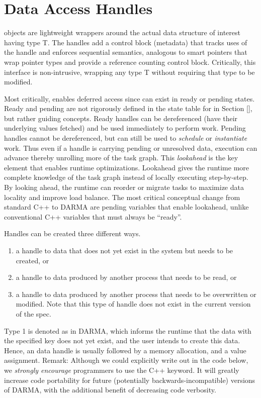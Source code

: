 

\section{Data Access Handles}
\label{sec:handles}
 objects are lightweight wrappers around the actual data structure of interest having type T. 
The handles add a control block (metadata) that tracks uses of the handle and enforces
\gls{sequential semantics}, analogous to smart pointers that wrap pointer types and provide a reference counting control block.
Critically, this interface is non-intrusive, wrapping any type T without requiring that type to be modified.

Most critically,  enables deferred access since \ahandle can exist in ready or pending states. 
Ready and pending are not rigorously defined in the state table for \ahandle in Section \ref{}, but rather guiding concepts.
Ready handles can be dereferenced (have their underlying values fetched) and be used immediately to perform work.
Pending handles cannot be dereferenced, but can still be used to \emph{schedule} or \emph{instantiate} work.
Thus even if a handle is carrying pending or unresolved data, execution can advance thereby unrolling more of the task graph.
This \emph{lookahead} is the key element that enables runtime optimizations.
Lookahead gives the runtime more complete knowledge of the task graph instead of locally executing step-by-step.
By looking ahead, the runtime can reorder or migrate tasks to maximize data locality and improve load balance.
The most critical conceptual change from standard C++ to DARMA are pending variables that enable lookahead, unlike conventional C++ variables that must always be ``ready''.

Handles can be created three different ways.
\begin{enumerate}
\item a handle to data that does not yet exist in the system
but needs to be created, or
\item a handle to data produced by another process that needs to
be read, or 
\item a handle to data produced by another process that needs to be overwritten or modified. 
Note that this type of handle does not exist in the current version of the spec.
\end{enumerate}

Type 1 is denoted as  in DARMA, 
which informs the runtime that the data with the 
specified key does not yet exist, and the user intends to 
create this data.%
Hence, an  data handle is usually 
followed by a memory allocation, and a value assignment. 
Remark: Although we could explicitly write out  in the code below,
we \emph{strongly encourage} programmers to use the C++  keyword.
It will greatly increase code portability for future (potentially backwards-incompatible) versions of DARMA,
with the additional benefit of decreasing code verbosity.

